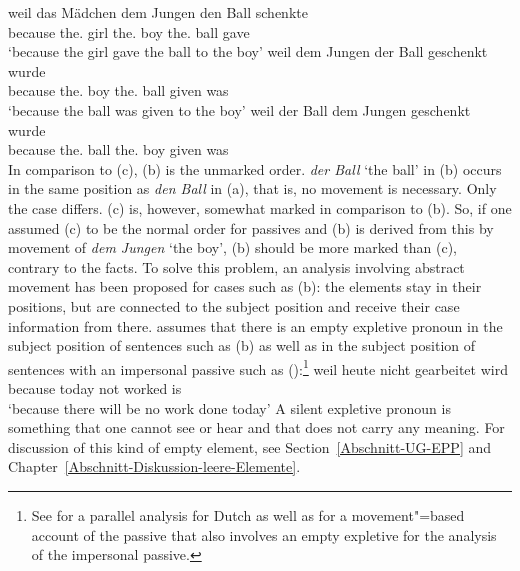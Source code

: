 \eal
\label{ex-passive-German-no-movement}
\ex 
\gll weil das Mädchen dem Jungen den Ball schenkte\\
     because the.\nom{} girl the.\dat{} boy the.\acc{} ball gave\\
\glt `because the girl gave the ball to the boy'
\ex 
\gll weil dem Jungen der Ball geschenkt wurde\\
	 because the.\dat{} boy the.\nom{} ball given was\\
\glt `because the ball was given to the boy'
\ex 
\gll weil der Ball dem Jungen geschenkt wurde\\
     because the.\nom{} ball the.\dat{} boy given was\\
\zl
In comparison to (c), (b) is the unmarked order. \emph{der Ball} `the ball' in (b) occurs
in the same position as \emph{den Ball} in (a), that is, no movement is necessary. Only the case differs.
(c) is, however, somewhat marked in comparison to (b). So, if one assumed (c) to
be the normal order for passives and (b) is derived from this by movement of \emph{dem
  Jungen} `the boy', (b) should be more marked than (c), contrary to the facts. To
solve this problem, an analysis involving abstract movement has been proposed for
cases such as (b): the elements stay in their positions, but are connected to
the subject position and receive their case information from there. \parencites[155--157]{Grewendorf88a}[]{Grewendorf93}
assumes that there is an empty expletive pronoun
in the subject position of sentences such as (b) as well as in the subject position of sentences with an
impersonal passive such as ():\footnote{%
	See  for a parallel analysis for Dutch as well as 
	 for a movement"=based account of the passive that also involves an
        empty expletive for the analysis of the impersonal passive.
}
\ea
\gll weil heute nicht gearbeitet wird\\
	 because today not worked is\\
\glt `because there will be no work done today'
\z
A silent expletive pronoun is something that one cannot see or hear and that does not carry any meaning. For discussion of 
this kind of empty element, see Section~\ref{Abschnitt-UG-EPP} and Chapter~\ref{Abschnitt-Diskussion-leere-Elemente}.

